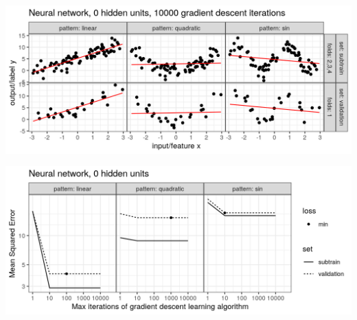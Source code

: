 \begin{frame}
  \includegraphics[width=\textwidth]{figure-overfitting-pred-units=0-maxit=10000.png}
\end{frame}


\begin{frame}
  \includegraphics[width=\textwidth]{figure-overfitting-data-loss-0.png}
\end{frame}

